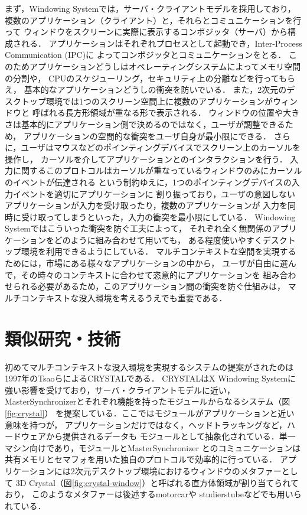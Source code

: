 まず，Windowing Systemでは，サーバ・クライアントモデルを採用しており，
複数のアプリケーション（クライアント）と，それらとコミュニケーションを行って
ウィンドウをスクリーンに実際に表示するコンポジッタ（サーバ）から構成される．
アプリケーションはそれぞれプロセスとして起動でき，Inter-Process Communication (IPC)に
よってコンポジッタとコミュニケーションをとる．
このためアプリケーションどうしはオペレーティングシステムによってメモリ空間の分割や，
CPUのスケジューリング，セキュリティ上の分離などを行ってもらえ，
基本的なアプリケーションどうしの衝突を防いでいる．
また，2次元のデスクトップ環境では1つのスクリーン空間上に複数のアプリケーションがウィンドウと
呼ばれる長方形領域が重なる形で表示される．
ウィンドウの位置や大きさは基本的にアプリケーション側で決めるのではなく，ユーザが調整できるため，
アプリケーションの空間的な衝突をユーザ自身が最小限にできる．
さらに，ユーザはマウスなどのポインティングデバイスでスクリーン上のカーソルを操作し，
カーソルを介してアプリケーションとのインタラクションを行う．
入力に関するこのプロトコルはカーソルが重なっているウィンドウのみにカーソルのイベントが伝達される
という制約ゆえに，1つのポインティングデバイスの入力イベントを適切にアプリケーションに
割り振っており，ユーザの意図しないアプリケーションが入力を受け取ったり，複数のアプリケーションが
入力を同時に受け取ってしまうといった，入力の衝突を最小限にしている．
Windowing Systemではこういった衝突を防ぐ工夫によって，
それぞれ全く無関係のアプリケーションをどのように組み合わせて用いても，
ある程度使いやすくデスクトップ環境を利用できるようにしている．
マルチコンテキストな空間を実現するためには，市場にある様々なアプリケーションの中から，
ユーザが自由に選んで，その時々のコンテキストに合わせて恣意的にアプリケーションを
組み合わせられる必要があるため，このアプリケーション間の衝突を防ぐ仕組みは，
マルチコンテキストな没入環境を考えるうえでも重要である．

\section{類似研究・技術}
\label{section:overview:related-work}

初めてマルチコンテキストな没入環境を実現するシステムの提案がされたのは
1997年のTsaoらによるCRYSTAL\cite{crystal}である．
CRYSTALはX Windowing Systemに強い影響を受けており，サーバ・クライアントモデルに近い，
MasterSynchronizerとそれぞれ機能を持ったモジュールからなるシステム（図\ref{fig:crystal}）
を提案している．ここではモジュールがアプリケーションと近い意味を持つが，
アプリケーションだけではなく，ヘッドトラッキングなど，ハードウェアから提供されるデータも
モジュールとして抽象化されている．単一マシン向けであり，モジュールとMasterSynchronizer
とのコミュニケーションは共有メモリとセマフォを用いた独自のプロトコルで効率的に行っている．
アプリケーションには2次元デスクトップ環境におけるウィンドウのメタファーとして
3D Crystal（図\ref{fig:crystal-window}）と呼ばれる直方体領域が割り当てられており，
このようなメタファーは後述するmotorcar\cite{reiling}や
studierstube\cite{studierstube}などでも用いられている．

